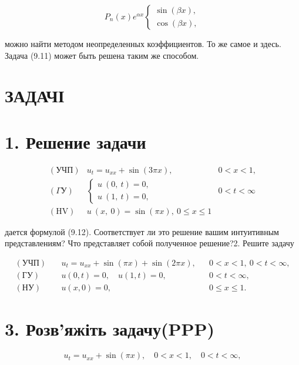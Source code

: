 \documentclass[
  ukrainian,
]{article}
\begin{document}
\[
P_n(x) e^{\alpha x}
\begin{cases} \sin{(\beta x)}, \\ \cos{(\beta x)}, \end{cases}
\]

можно найти методом неопределенных коэффициентов. То же самое и здесь.
Задача (9.11) может быть решена таким же способом.

\section{ЗАДАЧІ}\label{ux437ux430ux434ux430ux447ux456}

\section{1. Решение
задачи}\label{ux440ux435ux448ux435ux43dux438ux435-ux437ux430ux434ux430ux447ux438}

\[
\begin{array}{ll} (\text{УЧП}) & u_t = u_{xx} + \sin{(3\pi x)}, & 0 < x < 1, \\ (\Gamma \text{У}) & \begin{cases} u \ (0, \ t) = 0, \\ u \ (1, \ t) = 0, \end{cases} & 0 < t < \infty \\ (\text{HV}) & u \ (x, \ 0) = \sin{(\pi x)}, \ 0 \leqslant x \leqslant 1 \end{array}
\]

дается формулой (9.12). Соответствует ли это решение вашим интуитивным
представлениям? Что представляет собой полученное решение?2. Решите
задачу

\[
\begin{aligned}
(\text{УЧП})\quad & u_t = u_{xx} + \sin(\pi x) + \sin(2\pi x), && 0 < x < 1,\ 0 < t < \infty, \\
(\text{ГУ})\quad & u(0,t) = 0,\quad u(1,t) = 0, && 0 < t < \infty, \\
(\text{НУ})\quad & u(x,0) = 0, && 0 \leqslant x \leqslant 1.
\end{aligned}
\]

\section{3. Розв'яжіть
задачу(PPP)}\label{ux440ux43eux437ux432ux44fux436ux456ux442ux44c-ux437ux430ux434ux430ux447ux443ppp}

\[
u_t = u_{xx} + \sin(\pi x), \quad 0 < x < 1, \quad 0 < t < \infty,
\]
\end{document}
